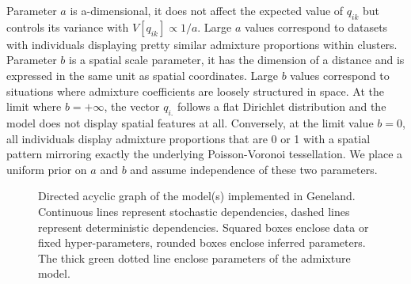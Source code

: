 \documentclass[a4paper,10pt]{article}
\begin{document}
Parameter $a$ is a-dimensional, it does not affect the expected value of  $q_{ik}$ but 
controls its variance  with $V[q_{ik}] \propto 1/a$. 
Large $a$ values correspond to datasets with individuals displaying pretty similar admixture 
proportions within clusters.
Parameter $b$ is a spatial scale parameter, it has the dimension of a distance and is expressed in 
the same unit as spatial coordinates. 
Large $b$ values correspond to situations where admixture coefficients are loosely structured in space. 
At the limit where  $b= +\infty$, 
the vector $q_{i.}$ follows a flat Dirichlet distribution and the model does not display spatial features at all. 
Conversely, at the limit value $b=0$, all individuals display  admixture proportions that are 0 or 1 
with a spatial pattern mirroring exactly 
the underlying Poisson-Voronoi tessellation.
We place a uniform prior on $a$ and $b$ and assume independence of these two parameters.




\begin{figure}[h]
\centerline{}
\caption{Directed acyclic graph of the model(s) implemented in {\sc Geneland}. 
Continuous lines represent stochastic dependencies, dashed lines represent 
deterministic dependencies. Squared boxes enclose data or fixed hyper-parameters, rounded boxes enclose inferred parameters. 
The thick green dotted line enclose parameters of the admixture model. }\label{fig:dag}
\end{figure}
\end{document}
